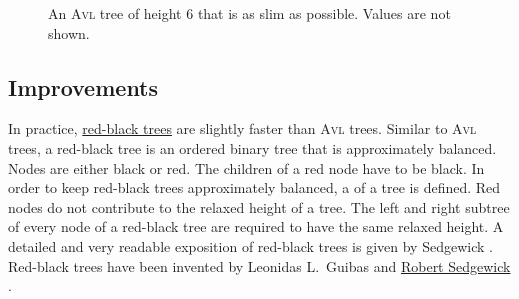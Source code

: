 \begin{figure}[!ht]
  \centering
  \caption{An \textsc{Avl} tree of height 6 that is as slim as possible. Values are not shown.}
  \label{fig:avl-worst-case}
\end{figure}

\subsection{Improvements}
In practice, 
\href{https://en.wikipedia.org/wiki/Red-black_trees}{red-black trees} 
are slightly faster than \textsc{\textsc{Avl}} trees.  Similar to
\textsc{\textsc{Avl}} trees, a  red-black tree
  is an ordered binary tree that is approximately balanced.  Nodes are either black or red.
The children of a red node have to be black.  In order to keep red-black trees approximately
balanced, a  of a tree is defined.  Red nodes do not contribute to the relaxed
height of a tree.  The left and right subtree of every node of a red-black tree are required to have the same 
relaxed height.  A detailed and very readable exposition of red-black trees is given by Sedgewick
\cite{sedgewick:2011}.  Red-black trees have been invented by Leonidas L.~Guibas and 
\href{https://en.wikipedia.org/wiki/Robert_Sedgewick_(computer_scientist)}{Robert Sedgewick} \cite{guibas:78}.

